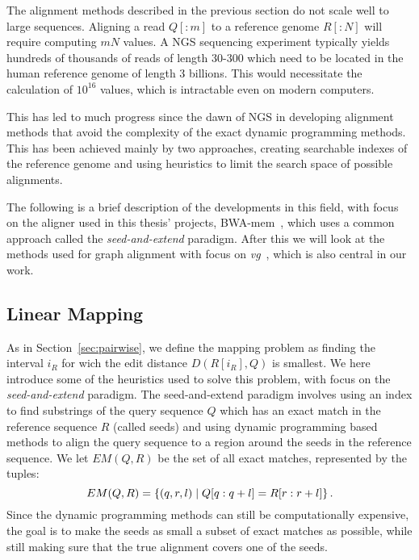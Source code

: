 The alignment methods described in the previous section do not scale well to large sequences.
Aligning a read $Q[:m]$ to a reference genome $R[:N]$ will require computing $mN$ values.
A NGS sequencing experiment typically yields hundreds of thousands of reads of length 30-300 which need to be located in the human reference genome of length 3 billions.
This would necessitate the calculation of $10^{16}$ values, which is intractable even on modern computers.

This has led to much progress since the dawn of NGS in developing alignment methods that avoid the complexity of the exact dynamic programming methods.
This has been achieved mainly by two approaches, creating searchable indexes of the reference genome and using heuristics to limit the search space of possible alignments.

The following is a brief description of the developments in this field, with focus on the aligner used in this thesis' projects, BWA-mem~\cite{bwamem}, which uses a common approach called the \emph{seed-and-extend} paradigm.
After this we will look at the methods used for graph alignment with focus on \emph{vg}~\cite{vg}, which is also central in our work.

\subsection{Linear Mapping}
As in Section~\ref{sec:pairwise}, we define the mapping problem as finding the interval $i_R$ for wich the edit distance $D(R[i_R], Q)$ is smallest. We here introduce some of the heuristics used to solve this problem, with focus on the \emph{seed-and-extend} paradigm. The seed-and-extend paradigm involves using an index to find substrings of the query sequence $Q$ which has an exact match in the reference sequence $R$ (called seeds) and using dynamic programming based methods to align the query sequence to a region around the seeds in the reference sequence. We let $EM(Q, R)$ be the set of all exact matches, represented by the tuples:
\[EM(Q, R) = \left\{(q, r, l) \mid Q[q:q+l]=R[r:r+l]\right\}.\]
Since the dynamic programming methods can still be computationally expensive, the goal is to make the seeds as small a subset of exact matches as possible, while still making sure that the true alignment covers one of the seeds.
 

